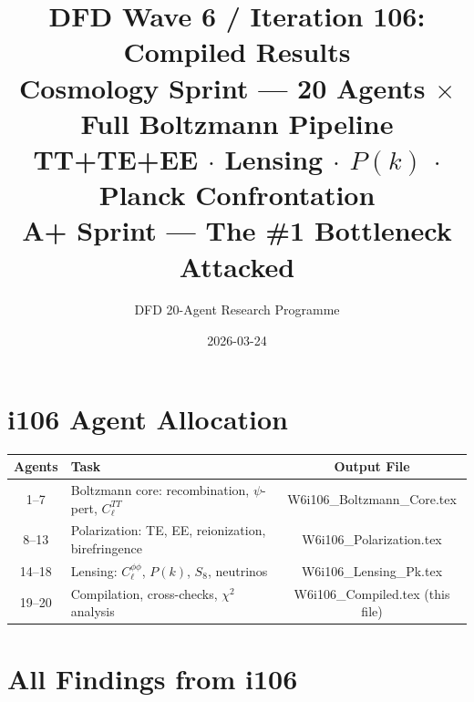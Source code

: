 \documentclass[11pt,a4paper]{article}
\title{DFD Wave 6 / Iteration 106: Compiled Results\\[6pt]
\large Cosmology Sprint --- 20 Agents $\times$ Full Boltzmann Pipeline\\
TT+TE+EE $\cdot$ Lensing $\cdot$ $P(k)$ $\cdot$ Planck Confrontation\\[6pt]
\normalsize A+ Sprint --- The \#1 Bottleneck Attacked}
\author{DFD 20-Agent Research Programme}
\date{2026-03-24}
\begin{document}
\maketitle

\section{i106 Agent Allocation}

\begin{center}
\begin{tabular}{clc}
\toprule
\textbf{Agents} & \textbf{Task} & \textbf{Output File} \\
\midrule
1--7 & Boltzmann core: recombination, $\psi$-pert, $C_\ell^{TT}$ & W6i106\_Boltzmann\_Core.tex \\
8--13 & Polarization: TE, EE, reionization, birefringence & W6i106\_Polarization.tex \\
14--18 & Lensing: $C_\ell^{\phi\phi}$, $P(k)$, $S_8$, neutrinos & W6i106\_Lensing\_Pk.tex \\
19--20 & Compilation, cross-checks, $\chi^2$ analysis & W6i106\_Compiled.tex (this file) \\
\bottomrule
\end{tabular}
\end{center}


\section{All Findings from i106}
\end{document}
